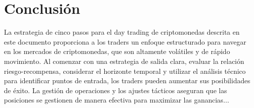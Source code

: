 \documentclass[12pt]{article}
\begin{document}
\section{Conclusión}

    La estrategia de cinco pasos para el day trading de criptomonedas descrita en este documento proporciona a los traders un enfoque estructurado para navegar en los mercados de criptomonedas, que son altamente volátiles y de rápido movimiento. Al comenzar con una estrategia de salida clara, evaluar la relación riesgo-recompensa, considerar el horizonte temporal y utilizar el análisis técnico para identificar puntos de entrada, los traders pueden aumentar sus posibilidades de éxito. La gestión de operaciones y los ajustes tácticos aseguran que las posiciones se gestionen de manera efectiva para maximizar las ganancias...
\end{document}
